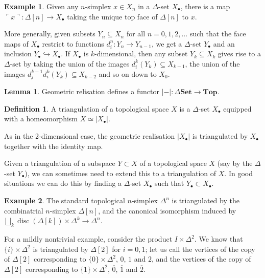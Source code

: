\documentclass{tufte-handout}
\def\Set {\mathbf{Set}}
\def\Top {\mathbf{Top}}
\DeclareMathOperator{\disc}{disc}
\theoremstyle{definition}
\newtheorem{lemma}{Lemma}
\newtheorem{definition}{Definition}
\newtheorem{example}{Example}
\begin{document}
\begin{example}\label{eg:name_of_simplex}
Given any $n$-simplex $x\in X_n$ in a $\Delta$-set $X_\bullet$, there is a map 
$\ulcorner x\urcorner\colon \Delta[n] \to X_\bullet$ taking the unique top face of $\Delta[n]$ to $x$.
\end{example}

More generally, given subsets $Y_n \subseteq X_n$ for all $n=0,1,2,\ldots$ such that the 
face maps of $X_\bullet$ restrict to functions $d_i^n\colon Y_n\to Y_{n-1}$, we get a 
$\Delta$-set $Y_\bullet$ and an inclusion $Y_\bullet \hookrightarrow X_\bullet$. If 
$X_\bullet$ is $k$-dimensional, then any subset $Y_k \subseteq X_k$ gives rise to a $\Delta$-set
by taking the union of the images $d_i^k(Y_k) \subseteq X_{k-1}$, the union of the images 
$d_j^{k-1}d_i^k(Y_k)\subseteq X_{k-2}$ and so on down to $X_0$.


\begin{lemma}
Geometric relisation defines a functor $|-|\colon \Delta\Set \to \Top$.
\end{lemma}


\begin{definition}
A triangulation of a topological space $X$ is a $\Delta$-set $X_\bullet$ equipped with a 
homeomorphism $X\simeq |X_\bullet|$.
\end{definition}

As in the 2-dimensional case, the geometric realisation $|X_\bullet|$ is triangulated by
$X_\bullet$ together with the identity map.

Given a triangulation of a subspace $Y\subset X$ of a topological space $X$ (say by the $\Delta$-set $Y_\bullet$), we
can sometimes need to extend this to a triangulation of $X$. In good situations we can do this
by finding a $\Delta$-set $X_\bullet$ such that $Y_\bullet \subset X_\bullet$.


\begin{example}
The standard topological $n$-simplex $\Delta^n$ is triangulated by the combinatrial $n$-simplex
$\Delta[n]$, and the canonical isomorphism induced by $\bigsqcup_k \disc(\Delta[k])\times \Delta^k\to \Delta^n$.
\end{example}

For a mildly nontrivial example, consider the product $I\times \Delta^2$. We know that 
$\{i\}\times \Delta^2$ is triangulated by $\Delta[2]$ for $i=0,1$; let us call the vertices
of the copy of $\Delta[2]$ corresponding to $\{0\}\times \Delta^2$, $0$, $1$ and $2$, and the
vertices of the copy of $\Delta[2]$ corresponding to $\{1\}\times \Delta^2$, $\overline{0}$, 
$\overline{1}$ and $\overline{2}$. 
\end{document}
